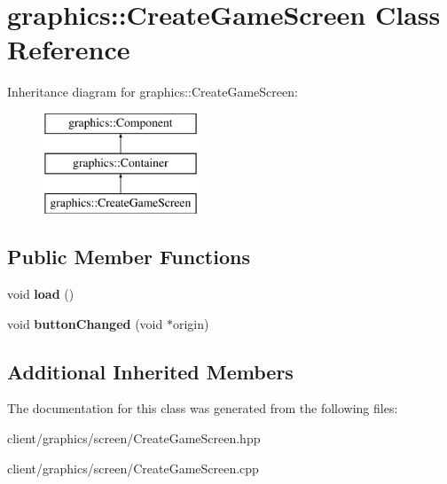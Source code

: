 \hypertarget{classgraphics_1_1_create_game_screen}{\section{graphics\-:\-:Create\-Game\-Screen Class Reference}
\label{classgraphics_1_1_create_game_screen}
}
Inheritance diagram for graphics\-:\-:Create\-Game\-Screen\-:\begin{figure}[H]
\begin{center}
\leavevmode
\includegraphics[height=3.000000cm]{classgraphics_1_1_create_game_screen}
\end{center}
\end{figure}
\subsection*{Public Member Functions}
\begin{DoxyCompactItemize}
\item 
\hypertarget{classgraphics_1_1_create_game_screen_a1f7fb10a78808a82d0354b32a2aaa064}{void {\bfseries load} ()}\label{classgraphics_1_1_create_game_screen_a1f7fb10a78808a82d0354b32a2aaa064}

\item 
\hypertarget{classgraphics_1_1_create_game_screen_a653fc959fa6b18aabb8376a55c566505}{void {\bfseries button\-Changed} (void $\ast$origin)}\label{classgraphics_1_1_create_game_screen_a653fc959fa6b18aabb8376a55c566505}

\end{DoxyCompactItemize}
\subsection*{Additional Inherited Members}


The documentation for this class was generated from the following files\-:\begin{DoxyCompactItemize}
\item 
client/graphics/screen/Create\-Game\-Screen.\-hpp\item 
client/graphics/screen/Create\-Game\-Screen.\-cpp\end{DoxyCompactItemize}
